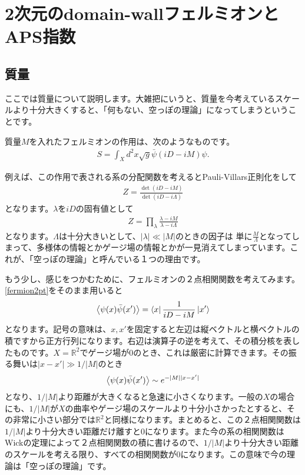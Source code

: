 \documentclass[paper=a4, fontsize=12pt, line_length=16cm, number_of_lines=33,dvipdfmx]{jlreq}
\numberwithin{equation}{section}
\newcommand{\Rb}{\mathbb{R}}
\newcommand{\psib}{\bar{\psi}}
\begin{document}
\section{2次元のdomain-wallフェルミオンとAPS指数}
\subsection{質量}
ここでは質量について説明します。大雑把にいうと、質量を今考えているスケールより十分大きくすると、「何もない、空っぽの理論」になってしまうということです。

質量$M$を入れたフェルミオンの作用は、次のようなものです。
\begin{align}
  S=\int_{X}d^2 x \sqrt{g}\psib (iD-iM)\psi.\label{2dmassivefermion}
\end{align}

例えば、この作用で表される系の分配関数を考えるとPauli-Villars正則化をして
\begin{align}
  Z=\frac{\det(iD-iM)}{\det(iD-i\Lambda)}
\end{align}
となります。$\lambda$を$iD$の固有値として
\begin{align}
  Z=\prod_{\lambda}\frac{\lambda-iM}{\lambda-i\Lambda}
\end{align}
となります。$\Lambda$は十分大きいとして、$|\lambda|\ll |M|$のときの因子は
単に$\frac{M}{\Lambda}$となってしまって、多様体の情報とかゲージ場の情報とかが一見消えてしまっています。これが、「空っぽの理論」と呼んでいる１つの理由です。

もう少し、感じをつかむために、フェルミオンの２点相関関数を考えてみます。\eqref{fermion2pt}をそのまま用いると
\begin{align}
  \expval{\psi(x)\psib(x')}=\bra{x}\frac{1}{iD-iM}\ket{x'}
\end{align}
となります。記号の意味は、$x,x'$を固定すると左辺は縦ベクトルと横ベクトルの積ですから正方行列になります。右辺は演算子の逆を考えて、その積分核を表したものです。$X=\Rb^2$でゲージ場が$0$のとき、これは厳密に計算できます。その振る舞いは$|x-x'|\gg 1/|M|$のとき
\begin{align}
  \expval{\psi(x)\psib(x')}\sim e^{-|M||x-x'|}
\end{align}
となり、$1/|M|$より距離が大きくなると急速に小さくなります。一般の$X$の場合にも、$1/|M|$が$X$の曲率やゲージ場のスケールより十分小さかったとすると、その非常に小さい部分では$\Rb^2$と同様になります。まとめると、この２点相関関数は$1/|M|$より十分大きい距離だけ離すと$0$になります。また今の系の相関関数はWickの定理によって２点相関関数の積に書けるので、$1/|M|$より十分大きい距離のスケールを考える限り、すべての相関関数が$0$になります。この意味で今の理論は「空っぽの理論」です。
\end{document}
